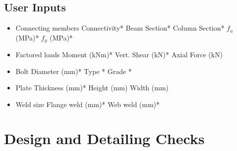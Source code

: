 \documentclass[11.5pt,a4paper,oneside]{report}
\begin{document}
\tableofcontents
\newpage
\printglossary[type=symbolslist,style=long]

\begin{Form}

	

\chapter*{User Inputs}
%
\begin{itemize}
	\item Connecting members
		\subitem Connectivity*
		\subitem Beam Section*
		\subitem Column Section*
		\subitem $f_u$ (MPa)* 
		\subitem $f_y$ (MPa)* 
	\item Factored loads
		\subitem Moment (kNm)*
		\subitem Vert. Shear (kN)*
		\subitem Axial Force (kN)
	\item Bolt
		\subitem Diameter (mm)*
		\subitem Type *
		\subitem Grade *
	\item Plate
		\subitem Thickness (mm)*
		\subitem Height (mm)
		\subitem Width (mm)
	\item Weld size
		\subitem Flange weld (mm)*
		\subitem Web weld (mm)*
\end{itemize}
\part*{Design and Detailing Checks}

\end{Form}
\end{document}
